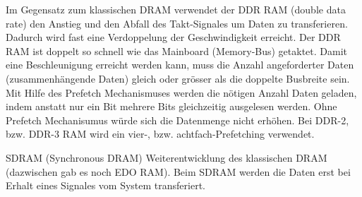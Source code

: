 \documentclass[10pt]{article}
\begin{document}
\begin{enumerate}[label=\alph*)]
		Im Gegensatz zum klassischen DRAM verwendet der DDR RAM (double data rate) den Anstieg und den Abfall des Takt-Signales um Daten zu transferieren. Dadurch wird fast eine Verdoppelung der Geschwindigkeit erreicht. Der DDR RAM ist doppelt so schnell wie das Mainboard (Memory-Bus) getaktet. Damit eine Beschleunigung erreicht werden kann, muss die Anzahl angeforderter Daten (zusammenhängende Daten) gleich oder grösser als die doppelte Busbreite sein. 
		Mit Hilfe des Prefetch Mechanismuses werden die nötigen Anzahl Daten geladen, indem anstatt nur ein Bit mehrere Bits gleichzeitig ausgelesen werden. Ohne Prefetch Mechanisumus würde sich die Datenmenge nicht erhöhen. Bei DDR-2, bzw. DDR-3 RAM wird ein vier-, bzw. achtfach-Prefetching verwendet. 

		SDRAM (Synchronous DRAM) Weiterentwicklung des klassischen DRAM (dazwischen gab es noch EDO RAM). Beim SDRAM werden die Daten erst bei Erhalt eines Signales vom System transferiert. 
		
\end{enumerate}


\end{document}
